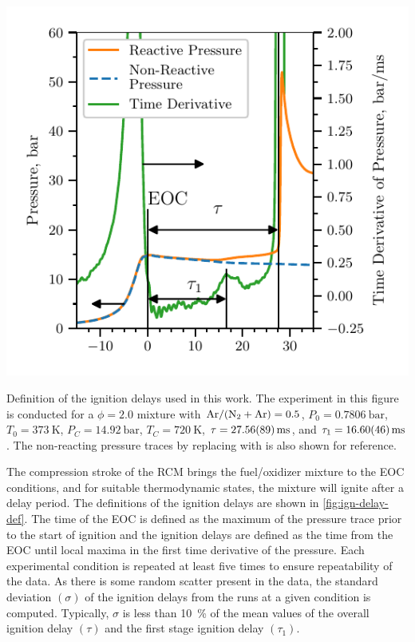 \documentclass[letterpaper, review, sort&compress]{elsarticle}
\begin{document}
\begin{center}
    \captionsetup{type=figure}
    \includegraphics{figures/ignition_delay_definition.pdf}
    \caption{Definition of the ignition delays used in this work. The experiment in this figure is
    conducted for a \(\phi=2.0\) mixture with \mbox{\(\ce{Ar}/(\ce{N2}+\ce{Ar})=0.5\)},
    \(P_0=\SI{0.7806}{\bar}\), \(T_0=\SI{373}{\K}\), \(P_C=\SI{14.92}{\bar}\), \(T_C=\SI{720}{\K}\),
    \(\tau=\SI{27.56\pm0.89}{\ms}\), and \(\tau_1=\SI{16.60\pm0.46}{\ms}\). The non-reacting
    pressure traces by replacing  with  is also shown for reference.}
    \label{fig:ign-delay-def}
\end{center}

The compression stroke of the RCM brings the fuel/oxidizer mixture to the EOC conditions, and for
suitable thermodynamic states, the mixture will ignite after a delay period. The definitions of the
ignition delays are shown in \cref{fig:ign-delay-def}. The time of the EOC is defined as the maximum
of the pressure trace prior to the start of ignition and the ignition delays are defined as the time
from the EOC until local maxima in the first time derivative of the pressure. Each experimental
condition is repeated at least five times to ensure repeatability of the data. As there is some
random scatter present in the data, the standard deviation \((\sigma)\) of the ignition delays from
the runs at a given condition is computed. Typically, \(\sigma\) is less than \SI{10}{\percent} of
the mean values of the overall ignition delay \((\tau)\) and the first stage ignition delay
\((\tau_1)\).
\end{document}
